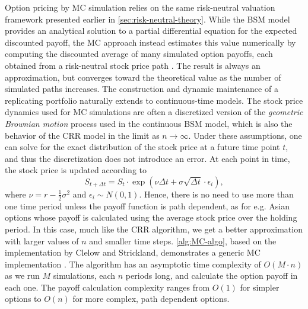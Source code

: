 \documentclass[english,12pt,a4paper,pdftex,sci,utf8]{aaltothesis}
\begin{document}
Option pricing by MC simulation relies on the same risk-neutral valuation framework presented earlier in \cref{sec:risk-neutral-theory}. While the BSM model provides an analytical solution to a partial differential equation for the expected discounted payoff, the MC approach instead estimates this value numerically by computing the discounted average of many simulated option payoffs, each obtained from a risk-neutral stock price path \cite{boyle1977options}. The result is always an approximation, but converges toward the theoretical value as the number of simulated paths increases. The construction and dynamic maintenance of a replicating portfolio naturally extends to continuous-time models. The stock price dynamics used for MC simulations are often a discretized version of the \emph{geometric Brownian motion} process used in the continuous BSM model, which is also the behavior of the CRR model in the limit as $n \rightarrow \infty$. Under these assumptions, one can solve for the exact distribution of the stock price at a future time point $t$, and thus the discretization does not introduce an error. At each point in time, the stock price is updated according to
\begin{equation*}
S_{t+\Delta t} = S_t \cdot \exp \left( \nu \Delta t + \sigma \sqrt{\Delta t} \cdot \epsilon_i \right),
\label{eq:GBM-price}
\end{equation*}
where $\nu=r-\frac{1}{2}\sigma^2$ and $\epsilon_i \sim N(0,1)$. Hence, there is no need to use more than one time period unless the payoff function is path dependent, as for e.g. Asian options whose payoff is calculated using the average stock price over the holding period. In this case, much like the CRR algorithm, we get a better approximation with larger values of $n$ and smaller time steps. \cref{alg:MC-algo}, based on the implementation by Clelow and Strickland, demonstrates a generic MC implementation \cite{clelow1998implementing}. The algorithm has an asymptotic time complexity of $O(M \cdot n)$ as we run $M$ simulations, each $n$ periods long, and calculate the option payoff in each one. The payoff calculation complexity ranges from $O(1)$ for simpler options to $O(n)$ for more complex, path dependent options. 
\end{document}
